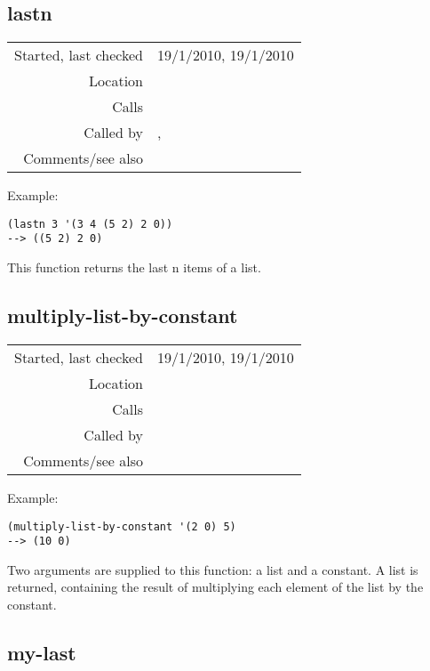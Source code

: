 \subsection*{lastn}\label{fun:lastn}

\vspace{0.3cm}
\begin{tabular}{r|p{8cm}}
Started, last checked & 19/1/2010, 19/1/2010 \\
Location & \nameref{sec:list-processing} \\
Calls & \nameref{fun:last-first} \\
Called by & \nameref{fun:add-to-nth}, \nameref{fun:remove-nth} \\
Comments/see also & 
\end{tabular}

\vspace{0.5cm}
\noindent Example:
\begin{verbatim}
(lastn 3 '(3 4 (5 2) 2 0))
--> ((5 2) 2 0)
\end{verbatim}

\noindent This function returns the last n items of a
list.


\subsection*{multiply-list-by-constant}\label{fun:multiply-list-by-constant}

\vspace{0.3cm}
\begin{tabular}{r|p{8cm}}
Started, last checked & 19/1/2010, 19/1/2010 \\
Location & \nameref{sec:list-processing} \\
Calls & \\
Called by & \\
Comments/see also & 
\end{tabular}

\vspace{0.5cm}
\noindent Example:
\begin{verbatim}
(multiply-list-by-constant '(2 0) 5)
--> (10 0)
\end{verbatim}

\noindent Two arguments are supplied to this function:
a list and a constant. A list is returned, containing
the result of multiplying each element of the list by
the constant.


\subsection*{my-last}\label{fun:my-last}

